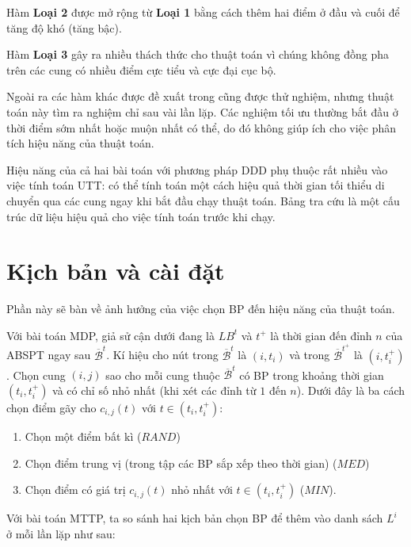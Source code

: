 \documentclass[../main.tex]{subfiles}
\begin{document}
Hàm \textbf{Loại 2} được mở rộng từ \textbf{Loại 1} bằng cách thêm hai
điểm ở đầu và cuối để tăng độ khó (tăng bậc).

Hàm \textbf{Loại 3} gây ra nhiều thách thức cho thuật toán vì chúng
không đồng pha trên các cung có nhiều điểm cực tiểu và cực đại cục bộ.

Ngoài ra các hàm khác được đề xuất trong \cite{figliozzi2012time} cũng
được thử nghiệm, nhưng thuật toán này tìm ra nghiệm chỉ sau vài lần lặp.
Các nghiệm tối ưu thường bắt đầu ở thời điểm sớm nhất hoặc muộn nhất có
thể, do đó không giúp ích cho việc phân tích hiệu năng của thuật toán.

Hiệu năng của cả hai bài toán với phương pháp DDD phụ thuộc rất nhiều
vào việc tính toán UTT: có thể tính toán một cách hiệu quả thời gian tối
thiểu di chuyển qua các cung ngay khi bắt đầu chạy thuật toán. Bảng tra
cứu là một cấu trúc dữ liệu hiệu quả cho việc tính toán trước khi chạy.

\section{Kịch bản và cài
đặt}\label{kux1ecbch-bux1ea3n-vuxe0-cuxe0i-ux111ux1eb7t}

Phần này sẽ bàn về ảnh hưởng của việc chọn BP đến hiệu năng của
thuật toán.

Với bài toán MDP, giả sử cận dưới đang là \(LB^t\) và \(t^+\) là thời
gian đến đỉnh \(n\) của ABSPT ngay sau \(\overline{\mathcal{B}}^t\). Kí
hiệu cho nút trong \(\overline{\mathcal{B}}^t\) là \((i,t_i)\) và trong
\(\overline{\mathcal{B}}^{t^+}\) là \((i, t_i^+)\). Chọn cung \((i,j)\)
sao cho mỗi cung thuộc \(\overline{\mathcal{B}}^{t}\) có BP trong
khoảng thời gian \((t_i, t_i^+)\) và có chỉ số nhỏ nhất (khi xét các
đỉnh từ \(1\) đến \(n\)). Dưới đây là ba cách chọn điểm gãy cho
\(c_{i,j}(t)\) với \(t\in (t_i, t_i^+)\):

\begin{enumerate}
\def\labelenumi{\arabic{enumi}.}
\tightlist
\item
  Chọn một điểm bất kì (\(RAND\))
\item
  Chọn điểm trung vị (trong tập các BP sắp xếp theo thời gian)
  (\(MED\))
\item
  Chọn điểm có giá trị \(c_{i, j}(t)\) nhỏ nhất với
  \(t\in (t_i, t_i^+)\) (\(MIN\)).
\end{enumerate}

Với bài toán MTTP, ta so sánh hai kịch bản chọn BP để thêm vào
danh sách \(L^i\) ở mỗi lần lặp như sau:
\end{document}
